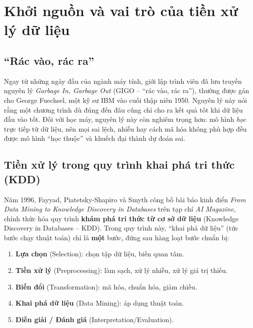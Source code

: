 \section{Khởi nguồn và vai trò của tiền xử lý dữ liệu}

\subsection{``Rác vào, rác ra''}

Ngay từ những ngày đầu của ngành máy tính, giới lập trình viên đã lưu truyền nguyên lý \textit{Garbage In, Garbage Out} (GIGO -- ``rác vào, rác ra''), thường được gán cho George Fuechsel, một kỹ sư IBM vào cuối thập niên 1950. Nguyên lý này nói rằng một chương trình dù đúng đến đâu cũng chỉ cho ra kết quả tốt khi dữ liệu đầu vào tốt. Đối với học máy, nguyên lý này còn nghiêm trọng hơn: mô hình \textit{học} trực tiếp từ dữ liệu, nên mọi sai lệch, nhiễu hay cách mã hóa không phù hợp đều được mô hình ``học thuộc'' và khuếch đại thành dự đoán sai.

\subsection{Tiền xử lý trong quy trình khai phá tri thức (KDD)}

Năm 1996, Fayyad, Piatetsky-Shapiro và Smyth công bố bài báo kinh điển \textit{From Data Mining to Knowledge Discovery in Databases} trên tạp chí \textit{AI Magazine}, chính thức hóa quy trình \textbf{khám phá tri thức từ cơ sở dữ liệu} (Knowledge Discovery in Databases -- KDD). Trong quy trình này, ``khai phá dữ liệu'' (tức bước chạy thuật toán) chỉ là \textbf{một} bước, đứng sau hàng loạt bước chuẩn bị:

\begin{enumerate}
    \item \textbf{Lựa chọn} (Selection): chọn tập dữ liệu, biến quan tâm.
    \item \textbf{Tiền xử lý} (Preprocessing): làm sạch, xử lý nhiễu, xử lý giá trị thiếu.
    \item \textbf{Biến đổi} (Transformation): mã hóa, chuẩn hóa, giảm chiều.
    \item \textbf{Khai phá dữ liệu} (Data Mining): áp dụng thuật toán.
    \item \textbf{Diễn giải / Đánh giá} (Interpretation/Evaluation).
\end{enumerate}

